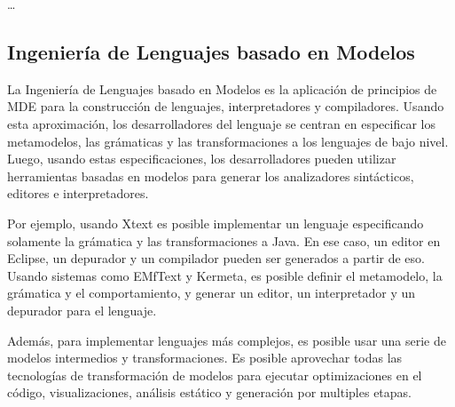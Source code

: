 \ldots



\subsection{Ingeniería de Lenguajes basado en Modelos}

La Ingeniería de Lenguajes basado en Modelos es la aplicación de principios de MDE para la construcción de lenguajes, interpretadores y compiladores.
Usando esta aproximación, los desarrolladores del lenguaje se centran en especificar los metamodelos, las grámaticas y las transformaciones a los lenguajes de bajo nivel.
Luego, usando estas especificaciones, los desarrolladores pueden utilizar herramientas basadas en modelos para generar los analizadores sintácticos, editores e interpretadores.

Por ejemplo, usando Xtext es posible implementar un lenguaje especificando solamente la grámatica y las transformaciones a Java.
En ese caso, un editor en Eclipse, un depurador y un compilador pueden ser generados a partir de eso.
Usando sistemas como EMfText y Kermeta, es posible definir el metamodelo, la grámatica y el comportamiento, y generar un editor, un interpretador y un depurador para el lenguaje.

Además, para implementar lenguajes más complejos, es posible usar una serie de modelos intermedios y transformaciones.
Es posible aprovechar todas las tecnologías de transformación de modelos para ejecutar optimizaciones en el código, visualizaciones, análisis estático y generación por multiples etapas.
      
